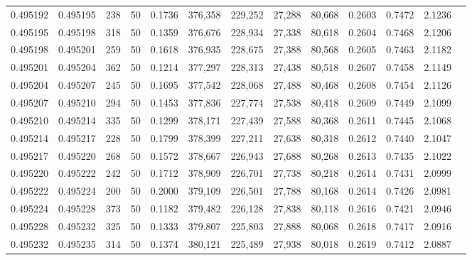 \begin{tabular}{rrrrrrrrrrrrr}
0.495192 & 0.495195 &   238 &  50 &                                     0.1736 & 376,358 & 229,252 &  27,288 &  80,668 & 0.2603 & 0.7472 & 2.1236 \\
0.495195 & 0.495198 &   318 &  50 &                                     0.1359 & 376,676 & 228,934 &  27,338 &  80,618 & 0.2604 & 0.7468 & 2.1206 \\
0.495198 & 0.495201 &   259 &  50 &                                     0.1618 & 376,935 & 228,675 &  27,388 &  80,568 & 0.2605 & 0.7463 & 2.1182 \\
0.495201 & 0.495204 &   362 &  50 &                                     0.1214 & 377,297 & 228,313 &  27,438 &  80,518 & 0.2607 & 0.7458 & 2.1149 \\
0.495204 & 0.495207 &   245 &  50 &                                     0.1695 & 377,542 & 228,068 &  27,488 &  80,468 & 0.2608 & 0.7454 & 2.1126 \\
0.495207 & 0.495210 &   294 &  50 &                                     0.1453 & 377,836 & 227,774 &  27,538 &  80,418 & 0.2609 & 0.7449 & 2.1099 \\
0.495210 & 0.495214 &   335 &  50 &                                     0.1299 & 378,171 & 227,439 &  27,588 &  80,368 & 0.2611 & 0.7445 & 2.1068 \\
0.495214 & 0.495217 &   228 &  50 &                                     0.1799 & 378,399 & 227,211 &  27,638 &  80,318 & 0.2612 & 0.7440 & 2.1047 \\
0.495217 & 0.495220 &   268 &  50 &                                     0.1572 & 378,667 & 226,943 &  27,688 &  80,268 & 0.2613 & 0.7435 & 2.1022 \\
0.495220 & 0.495222 &   242 &  50 &                                     0.1712 & 378,909 & 226,701 &  27,738 &  80,218 & 0.2614 & 0.7431 & 2.0999 \\
0.495222 & 0.495224 &   200 &  50 &                                     0.2000 & 379,109 & 226,501 &  27,788 &  80,168 & 0.2614 & 0.7426 & 2.0981 \\
0.495224 & 0.495228 &   373 &  50 &                                     0.1182 & 379,482 & 226,128 &  27,838 &  80,118 & 0.2616 & 0.7421 & 2.0946 \\
0.495228 & 0.495232 &   325 &  50 &                                     0.1333 & 379,807 & 225,803 &  27,888 &  80,068 & 0.2618 & 0.7417 & 2.0916 \\
0.495232 & 0.495235 &   314 &  50 &                                     0.1374 & 380,121 & 225,489 &  27,938 &  80,018 & 0.2619 & 0.7412 & 2.0887 \\

\end{tabular}
